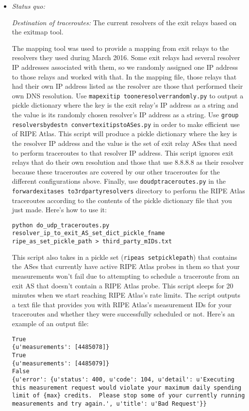 \documentclass{article}
\begin{document}
\begin{itemize}
\item \emph{Status quo:}

\emph{Destination of traceroutes:} The current resolvers of the exit relays based on 
the exitmap tool. 

The mapping tool was used to provide a mapping from exit relays to the resolvers they used 
during March 2016. Some exit relays had several resolver IP addresses associated with them, 
so we randomly assigned one IP address to those relays and worked with that. In the 
mapping file, those relays that had their own IP address listed as the resolver are those 
that performed their own DNS resolution. Use 
{\tt map\textunderscore exit\textunderscore ip\textunderscore 
to\textunderscore one\textunderscore resolver\textunderscore randomly.py} to output a 
pickle dictionary where the key is the exit relay's IP address as a string and the 
value is its randomly chosen resolver's IP address as a string. Use {\tt group\textunderscore 
resolvers\textunderscore by\textunderscore dest\textunderscore n\textunderscore 
convert\textunderscore exit\textunderscore ips\textunderscore to\textunderscore ASes.py} 
in order to make efficient use of RIPE Atlas. This script will produce a pickle 
dictionary where the key is the resolver IP address and the value is the set of 
exit relay ASes that need to perform traceroutes to that resolver IP address. This 
script ignores exit relays that do their own resolution and those that use 
8.8.8.8 as their resolver because these traceroutes are covered by our other 
traceroutes for the different configurations above. Finally, use 
{\tt do\textunderscore udp\textunderscore traceroutes.py} in the 
{\tt forward\textunderscore exit\textunderscore ases\textunderscore 
to\textunderscore 3rd\textunderscore party\textunderscore resolvers} 
directory to perform the RIPE Atlas 
traceroutes according to the contents of the pickle dictionary file that you 
just made. 
Here's how to use it:
\begin{lstlisting}
python do_udp_traceroutes.py resolver_ip_to_exit_AS_set_dict_pickle_fname ripe_as_set_pickle_path > third_party_mIDs.txt
\end{lstlisting}
This script also takes in a pickle set ({\tt ripe\textunderscore as\textunderscore 
set\textunderscore pickle\textunderscore path}) 
that contains the ASes that 
currently have active RIPE Atlas probes in them so that your measurements won't 
fail due to attempting to schedule a traceroute from an exit AS that doesn't contain 
a RIPE Atlas probe. This script sleeps for 20 minutes when we start reaching 
RIPE Atlas's rate limits. The script outputs a text file that provides you with 
RIPE Atlas's measurement IDs for your traceroutes and whether they were 
successfully scheduled or not. Here's an example of an output file:
\begin{lstlisting}
True
{u'measurements': [4485078]}
True
{u'measurements': [4485079]}
False
{u'error': {u'status': 400, u'code': 104, u'detail': u'Executing this measurement request would violate your maximum daily spending limit of {max} credits.  Please stop some of your currently running measurements and try again.', u'title': u'Bad Request'}}
\end{lstlisting}


\end{itemize}
\end{document}
